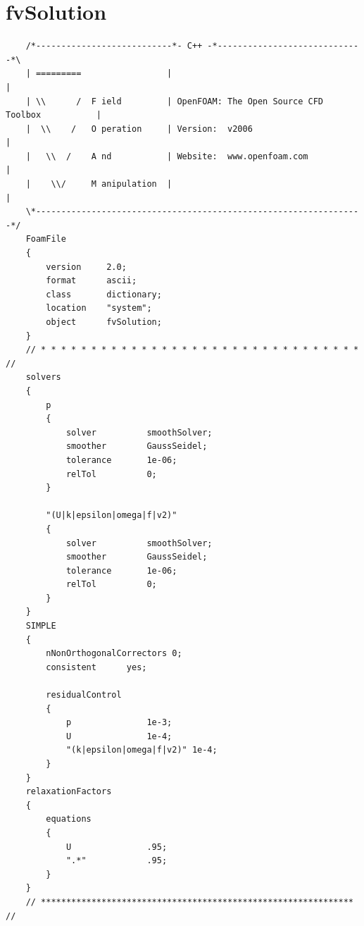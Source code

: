 \documentclass[a4paper,12pt]{report}
\theoremstyle{remark}
\begin{document}
{\let\clearpage\relax \chapter{fvSolution}\label{app:fvsol}}
\begin{verbatim}
	/*---------------------------*- C++ -*-----------------------------*\
	| =========                 |                                                 |
	| \\      /  F ield         | OpenFOAM: The Open Source CFD Toolbox           |
	|  \\    /   O peration     | Version:  v2006                                 |
	|   \\  /    A nd           | Website:  www.openfoam.com                      |
	|    \\/     M anipulation  |                                                 |
	\*-----------------------------------------------------------------*/
	FoamFile
	{
		version     2.0;
		format      ascii;
		class       dictionary;
		location    "system";
		object      fvSolution;
	}
	// * * * * * * * * * * * * * * * * * * * * * * * * * * * * * * * * //
	solvers
	{
		p
		{
			solver          smoothSolver;
			smoother        GaussSeidel;
			tolerance       1e-06;
			relTol          0; 
		}
		
		"(U|k|epsilon|omega|f|v2)"
		{
			solver          smoothSolver;
			smoother        GaussSeidel;
			tolerance       1e-06;
			relTol          0; 
		}
	}
	SIMPLE
	{
		nNonOrthogonalCorrectors 0;
		consistent      yes;
		
		residualControl
		{
			p               1e-3;
			U               1e-4;
			"(k|epsilon|omega|f|v2)" 1e-4;
		}
	}
	relaxationFactors
	{
		equations
		{
			U               .95; 
			".*"            .95;
		}
	}
	// ************************************************************** //
\end{verbatim}
	
\end{document}

